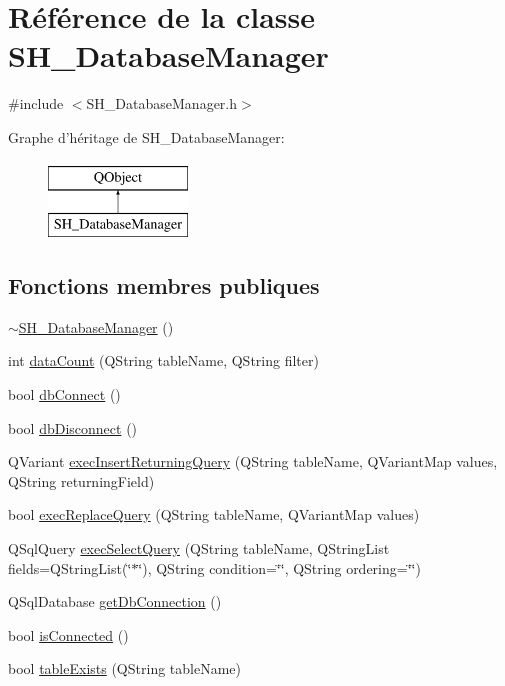 \hypertarget{classSH__DatabaseManager}{\section{Référence de la classe S\-H\-\_\-\-Database\-Manager}
\label{classSH__DatabaseManager}
}


{\ttfamily \#include $<$S\-H\-\_\-\-Database\-Manager.\-h$>$}

Graphe d'héritage de S\-H\-\_\-\-Database\-Manager\-:\begin{figure}[H]
\begin{center}
\leavevmode
\includegraphics[height=2.000000cm]{classSH__DatabaseManager}
\end{center}
\end{figure}
\subsection*{Fonctions membres publiques}
\begin{DoxyCompactItemize}
\item 
\hyperlink{classSH__DatabaseManager_ad899140e4638301b6a6ed68a3289b34b}{$\sim$\-S\-H\-\_\-\-Database\-Manager} ()
\item 
int \hyperlink{classSH__DatabaseManager_ad3e372d89b60b43e3f3bae649be6d7fb}{data\-Count} (Q\-String table\-Name, Q\-String filter)
\item 
bool \hyperlink{classSH__DatabaseManager_ab634ce39ef483e7ad2fe08d4b8ba74f7}{db\-Connect} ()
\item 
bool \hyperlink{classSH__DatabaseManager_a096c26457bbb03f92283c5d104401e90}{db\-Disconnect} ()
\item 
Q\-Variant \hyperlink{classSH__DatabaseManager_a55268fae16792142072af49238f7bb94}{exec\-Insert\-Returning\-Query} (Q\-String table\-Name, Q\-Variant\-Map values, Q\-String returning\-Field)
\item 
bool \hyperlink{classSH__DatabaseManager_a25e0f24d7833c2728f55b85be529063d}{exec\-Replace\-Query} (Q\-String table\-Name, Q\-Variant\-Map values)
\item 
Q\-Sql\-Query \hyperlink{classSH__DatabaseManager_ab8f9850cb68444ab9a4e613b36a3b044}{exec\-Select\-Query} (Q\-String table\-Name, Q\-String\-List fields=Q\-String\-List(\char`\"{}$\ast$\char`\"{}), Q\-String condition=\char`\"{}\char`\"{}, Q\-String ordering=\char`\"{}\char`\"{})
\item 
Q\-Sql\-Database \hyperlink{classSH__DatabaseManager_a0ce86f671946975c2e7b4ad50c9a92a2}{get\-Db\-Connection} ()
\item 
bool \hyperlink{classSH__DatabaseManager_aba5832c8be2fe4894781c9bf34be5b8b}{is\-Connected} ()
\item 
bool \hyperlink{classSH__DatabaseManager_ac18f4ee3abd86cb0db25b3cb593e28b8}{table\-Exists} (Q\-String table\-Name)
\end{DoxyCompactItemize}
